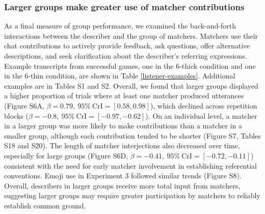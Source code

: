 \documentclass[9pt,twocolumn,twoside]{pnas-new}
\begin{document}
\begin{table}
\end{table}

\subsubsection*{Larger groups make greater use of matcher
contributions}\label{larger-groups-make-greater-use-of-matcher-contributions}

As a final measure of group performance, we examined the back-and-forth
interactions between the describer and the group of matchers. Matchers
use their chat contributions to actively provide feedback, ask
questions, offer alternative descriptions, and seek clarification about
the describer's referring expressions. Example transcripts from
successful games, one in the 6-thick condition and one in the 6-thin
condition, are shown in Table \ref{listener-examples}. Additional
examples are in Tables S1 and S2. Overall, we found that larger
groups displayed a higher proportion of trials where at least one
matcher produced utterances (Figure S6A,
\(\beta=0.79,\:95\%\:\mathrm{CrI}=[0.58, 0.98]\)), which declined across
repetition blocks (\(\beta=-0.8,\:95\%\:\mathrm{CrI}=[-0.97, -0.62]\)).
On an individual level, a matcher in a larger group was more likely to
make contributions than a matcher in a smaller group, although each
contribution tended to be shorter (Figure S7, Tables S18 and S20). The
length of matcher interjections also decreased over time, especially for
large groups (Figure S6D,
\(\beta=-0.41,\:95\%\:\mathrm{CrI}=[-0.72, -0.11]\)) consistent with the
need for early matcher involvement in establishing referential
conventions. Emoji use in Experiment 3 followed similar trends (Figure S8). Overall, describers in larger groups receive more total input
from matchers, suggesting larger groups may require greater
participation by matchers to reliably establish common ground.
\end{document}

